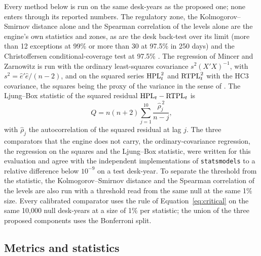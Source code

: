 Every method below is run on the same desk-years as the proposed one; none enters through its reported numbers.
The regulatory zone, the Kolmogorov--Smirnov distance alone and the Spearman correlation of the levels alone are the engine's own statistics and zones, as are the desk back-test over its limit (more than 12 exceptions at 99\% or more than 30 at 97.5\% in 250 days) and the Christoffersen conditional-coverage test at 97.5\% \citep{christoffersen1998}.
The regression of Mincer and Zarnowitz \citep{mincer1969} is run with the ordinary least-squares covariance $s^2(X'X)^{-1}$, with $s^2=\hat e'\hat e/(n-2)$, and on the squared series $\mathrm{HPL}_t^2$ and $\mathrm{RTPL}_t^2$ with the HC3 covariance, the squares being the proxy of the variance in the sense of \citet{patton2009}.
The Ljung--Box statistic \citep{ljung1978} of the squared residual $\mathrm{HPL}_t-\mathrm{RTPL}_t$ is
\begin{equation}
Q=n(n+2)\sum_{j=1}^{10}\frac{\hat\rho_j^{\,2}}{n-j},
\label{eq:ljung-box}
\end{equation}
with $\hat\rho_j$ the autocorrelation of the squared residual at lag $j$.
The three comparators that the engine does not carry, the ordinary-covariance regression, the regression on the squares and the Ljung--Box statistic, were written for this evaluation and agree with the independent implementations of \texttt{statsmodels} to a relative difference below $10^{-9}$ on a test desk-year.
To separate the threshold from the statistic, the Kolmogorov--Smirnov distance and the Spearman correlation of the levels are also run with a threshold read from the same null at the same 1\% size.
Every calibrated comparator uses the rule of Equation~\eqref{eq:critical} on the same 10,000 null desk-years at a size of 1\% per statistic; the union of the three proposed components uses the Bonferroni split.

\subsection{Metrics and statistics}
\label{sec:design-metrics}

